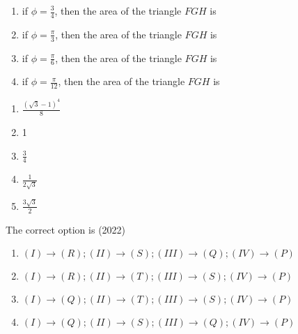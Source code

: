 \begin{enumerate}[label=\thesubsection.\arabic*.,ref=\thesubsection.\theenumi]
\begin{multicols}{2}
	\begin{enumerate}[label=(\Roman*),itemsep=1ex]
 \item if $\phi=\frac{3}{4}$, then the area of the triangle $FGH$ is 
 \item if $\phi=\frac{\pi}{3}$, then the area of the triangle $FGH$ is 
 \item  if $\phi =\frac{\pi}{6}$, then the area of the triangle $FGH$ is 
 \item if $\phi =\frac{\pi}{12}$, then the area of the triangle $FGH$ is 
\end{enumerate}
	\columnbreak
	\begin{enumerate}[label=(\Alph*)]
 \item    	$\frac{(\sqrt{3}-1)^4}{8}$        
 \item    	1                             
 \item  $\frac{3}{4}$               
 \item    	$\frac{1}{2\sqrt{3}}$       
 \item     $\frac{3\sqrt3}{2}$
\end{enumerate}
\end{multicols}
The correct option is
	\hfill (2022)
\begin{enumerate}	
 \item $(I) \to (R);(II) \to (S);(III) \to (Q);(IV) \to (P)$    
 \item $(I) \to (R);(II) \to (T);(III) \to (S);(IV) \to (P)$ 
 \item $(I) \to (Q);(II) \to (T);(III) \to (S);(IV) \to (P)$    
 \item $(I) \to (Q);(II) \to (S);(III) \to (Q);(IV) \to (P)$                                                         
\end{enumerate}
	\end{enumerate}
